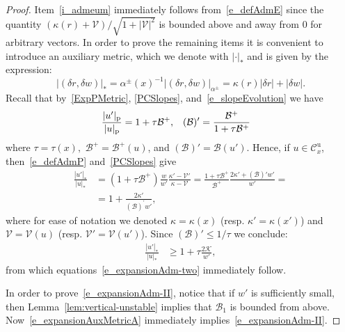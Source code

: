 \documentclass[AHL, Unicode, longabstracts,published]{cedram}
\newcommand{\ct}{r}
\newcommand{\fft}{\tau}
\newcommand{\curv}{\kappa}
\newcommand{\inv}{^{-1}}
\newcommand{\unstable}{\text{u}}
\newcommand{\cB}{\mathcal{B}}
\newcommand{\cK}{\mathcal{K}}
\newcommand{\pslope}{\mathcal{B}}
\newcommand{\cslope}{\mathcal{V}}
\newcommand{\cone}{\mathcal{C}}
\newcommand{\coneu}{\cone^\unstable}
\newcommand{\ppPrivate}[2]{#1^{#2}}
\newcommand{\prePrivate}[1]{\ppPrivate{#1}{-}}
\newcommand{\postPrivate}[1]{\ppPrivate{#1}{+}}
\newcommand{\prpslope}{\prePrivate{\pslope}}
\newcommand{\popslope}{\postPrivate{\pslope}}
\newcommand{\pme}{_\textup{p}}
\newcommand{\admPm}{_{\alpha^{\pm}}}
\newcommand{\aum}{_{*}}
\newcommand{\admFuncPm}{\alpha^{\pm}}
\renewcommand{\prpslope}{\cB}
\renewcommand{\prpslope}{\cB}
\renewcommand{\prpslope}{\cB}
\begin{document}
\begin{proof}
Item~\eqref{i_admeum} immediately follows from~\eqref{e_defAdmE} since the quantity $(\curv(r)+\cslope)/\sqrt{1+|\cslope|^{2}}$ is bounded above and away from $0$ for arbitrary vectors. In order to prove the remaining items it is convenient to introduce an auxiliary metric, which we denote with $|\cdot|\aum$ and is given by the expression:
\begin{equation}\label{StarMetric}
|(\delta\ct, \delta w)|\aum
= \admFuncPm(x)\inv|(\delta\ct,\delta w)|\admPm = \curv(\ct) |\delta\ct|+|\delta w|.
\end{equation}
Recall that by~\eqref{ExpPMetric}, \eqref{PCSlopes}, and~\eqref{e_slopeEvolution} we have
\begin{align*}
\frac{|u'|\pme}{|u|\pme} &= 1 + \fft\popslope,& (\prpslope)^{\prime}&=\frac{\popslope}{1+\fft \popslope}
\end{align*}
where $\fft = \fft(x),$ $\popslope = \popslope(u)$, and $(\prpslope)'=\prpslope(u')$. Hence, if $u\in\coneu_x$, then~\eqref{e_defAdmP} and~\eqref{PCSlopes} give
\begin{equation}\label{e_expansionAuxMetricA}
\begin{split}
\frac{|u'|\aum}{|u|\aum} &= (1 + \fft\popslope) \frac{w}{w'}\frac{\curv'-\cslope'}{\curv-\cslope} = \frac{1 + \fft\popslope}{\popslope}
\frac{2\curv'+(\prpslope)' w'}{w'} = \\ 
& = 1+\frac{2\curv'}{(\prpslope)^{\prime}w'},
\end{split}
\end{equation}
where for ease of notation we denoted $\curv = \curv(x)$ (resp. $\curv' = \curv(x')$) and $\cslope = \cslope(u)$ (resp. $\cslope' = \cslope(u')$). Since $(\prpslope)'\leq 1/\fft$ we conclude:
\begin{align}
\frac{|u'|\aum}{|u|\aum} & \ge \label{e_expansionAuxMetricB}
1+\fft\frac{2\cK}{w'},
\end{align}
from which equations~\eqref{e_expansionAdm-two} immediately follow.

In order to prove~\eqref{e_expansionAdm-II}, notice that if $w'$ is sufficiently small, then Lemma~\ref{lem:vertical-unstable} implies that $\prpslope_{1}$ is bounded from above. Now~\eqref{e_expansionAuxMetricA} immediately implies~\eqref{e_expansionAdm-II}.


\end{proof}
\end{document}
